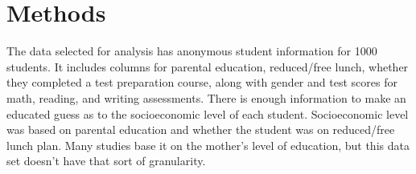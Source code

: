 \documentclass[man,12pt]{apa6} %
\begin{document}
\section{Methods}
The data selected for analysis has anonymous student information for 1000 students. It includes columns for parental education, reduced/free lunch, whether they completed a test preparation course, along with gender and test scores for math, reading, and writing assessments. There is enough information to make an educated guess as to the socioeconomic level of each student. Socioeconomic level was based on parental education and whether the student was on reduced/free lunch plan.  Many studies base it on the mother's level of education, but this data set doesn't have that sort of granularity. \cite{maternaleducation} \cite{maternaleducation2} \cite{maternaleducation3}
\end{document}

